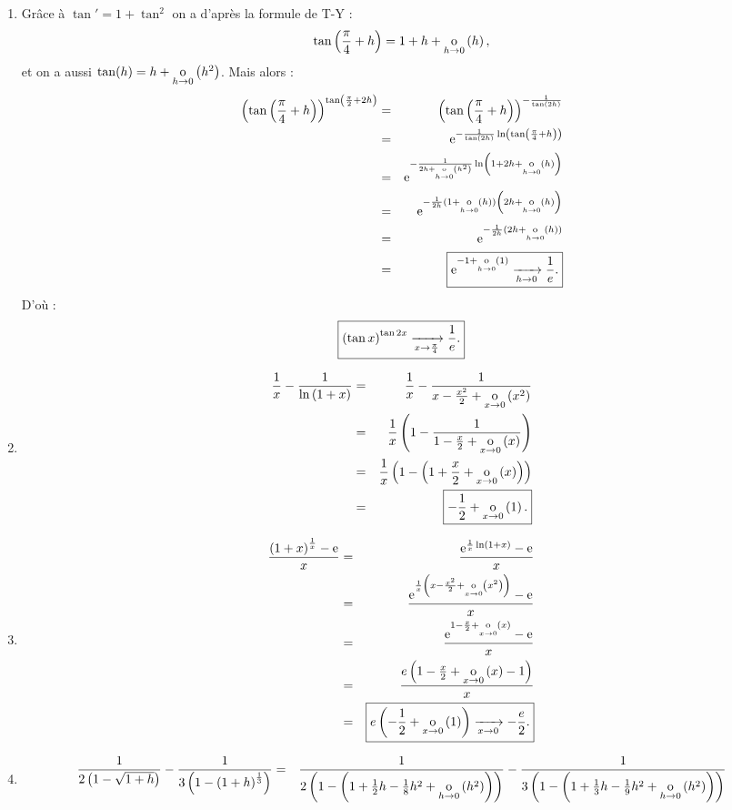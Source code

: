 \documentclass{magnolia}
\begin{document}
\begin{sol}
\begin{enumerate}
\item Grâce à $\tan'=1+\tan^2$ on a d'après la formule de T-Y :
$$\tan\left(\frac{\pi}{4}+h\right)=1+h+\underset{h \rightarrow 0}{\text{o}}\left(h\right),$$
et on a aussi $\tan(h)=h+\underset{h \rightarrow 0}{\text{o}}\left(h^2\right)$.
Mais alors :
\begin{eqnarray*}
\left(\tan\left(\frac{\pi}{4}+h\right)\right)^{\tan\left(\frac{\pi}{2}+2h\right)}&=&\left(\tan\left(\frac{\pi}{4}+h\right)\right)^{-\frac{1}{\tan(2h)}}\\
&=&{\rm e}^{-\frac{1}{\tan(2h)}\ln\left(\tan\left(\frac{\pi}{4}+h\right)\right)}\\
&=&{\rm e}^{-\frac{1}{2h+\underset{h \rightarrow 0}{\text{o}}\left(h^2\right)}\ln\left(1+2h+\underset{h \rightarrow 0}{\text{o}}\left(h\right)\right)}\\
&=&{\rm e}^{-\frac{1}{2h}(1+\underset{h \rightarrow 0}{\text{o}}\left(h\right))\left(2h+\underset{h \rightarrow 0}{\text{o}}\left(h\right)\right)}\\
&=&{\rm e}^{-\frac{1}{2h}(2h+\underset{h \rightarrow 0}{\text{o}}\left(h\right))}\\
&=&\boxed{{\rm e}^{-1+\underset{h \rightarrow 0}{\text{o}}\left(1\right)}\xrightarrow[h\rightarrow 0]{}{\frac{1}{e}}.}
\end{eqnarray*}
D'où :
\[\boxed{\left(\tan x\right)^{\tan 2x}\xrightarrow[x\rightarrow \frac{\pi}{4}]{}\frac{1}{e}.}\]
\item \begin{eqnarray*}
\frac{1}{x}-\frac{1}{\ln\left(1+x\right)}&=&\frac{1}{x}-\frac{1}{x-\frac{x^2}{2}+\underset{x \rightarrow 0}{\text{o}}\left(x^2\right)}\\
&=&\frac{1}{x}\left(1-\frac{1}{1-\frac{x}{2}+\underset{x \rightarrow 0}{\text{o}}\left(x\right)}\right)\\
&=&\frac{1}{x}\left(1-\left(1+\frac{x}{2}+\underset{x \rightarrow 0}{\text{o}}\left(x\right)\right)\right)\\
&=&\boxed{-\dfrac12+\underset{x \rightarrow 0}{\text{o}}\left(1\right).}
\end{eqnarray*}
\item 
\begin{eqnarray*}
\frac{\left(1+x\right)^{\frac{1}{x}}-{\rm e}}{x}&=&\frac{{\rm e}^{\frac{1}{x}\ln(1+x)}-{\rm e}}{x}\\
&=&\frac{{\rm e}^{\frac{1}{x}\left(x-\frac{x^2}{2}+\underset{x \rightarrow 0}{\text{o}}\left(x^2\right)\right)}-{\rm e}}{x}\\
&=&\frac{{\rm e}^{1-\frac{x}{2}+\underset{x \rightarrow 0}{\text{o}}\left(x\right)}-{\rm e}}{x}\\
&=&\frac{e\left(1-\frac{x}{2}+\underset{x \rightarrow 0}{\text{o}}\left(x\right)-1\right)}{x}\\
&=&\boxed{e\left(-\frac{1}{2}+\underset{x \rightarrow 0}{\text{o}}\left(1\right)\right)\xrightarrow[x\rightarrow 0]{}{-\frac{e}{2}}.}
\end{eqnarray*}
\item 
\begin{eqnarray*}
\frac{1}{2\p{1-\sqrt{1+h}}}-\frac{1}{3\p{1-\p{1+h}^{\frac{1}{3}}}}&=&\frac{1}{2\p{1-\p{1+\frac{1}{2}h-\frac{1}{8}h^2+\petitozero{h}{h^2}}}}-\frac{1}{3\p{1-\p{1+\frac{1}{3}h-\frac{1}{9}h^2+\petitozero{h}{h^2}}}}\\

\end{eqnarray*}
\end{enumerate}
\end{sol}
\end{document}
